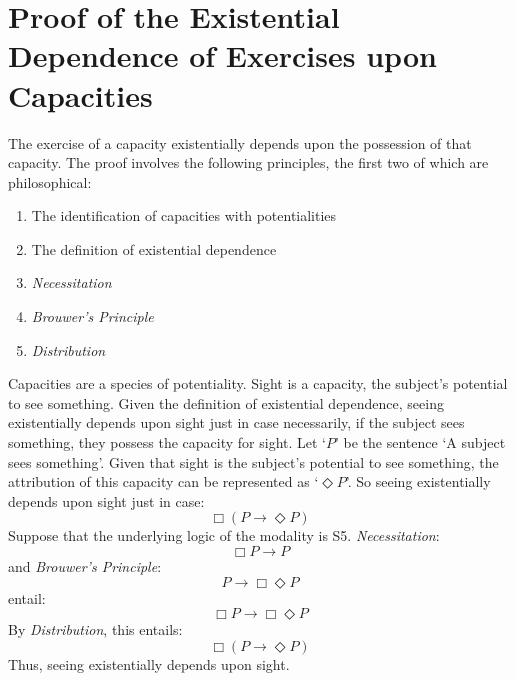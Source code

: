 \documentclass[12pt]{article}
\begin{document}

\appendix
\section{Proof of the Existential Dependence of Exercises upon Capacities} %
\label{sec:appendix}

The exercise of a capacity existentially depends upon the possession of that capacity. The proof involves the following principles, the first two of which are philosophical:
\begin{enumerate}
	\item The identification of capacities with potentialities
	\item The definition of existential dependence
	\item \emph{Necessitation}
	\item \emph{Brouwer's Principle}
	\item \emph{Distribution}
\end{enumerate}
Capacities are a species of potentiality. Sight is a capacity, the subject's potential to see something. Given the definition of existential dependence, seeing existentially depends upon sight just in case necessarily, if the subject sees something, they possess the capacity for sight. Let `\( P \)' be the sentence `A subject sees something'. Given that sight is the subject's potential to see something, the attribution of this capacity can be represented as `\( \Diamond P \)'. So seeing existentially depends upon sight just in case:
\[
	\Box(P \rightarrow \Diamond P)
\]
Suppose that the underlying logic of the modality is S5. \emph{Necessitation}:
\[
	\Box P \rightarrow P
\]
and \emph{Brouwer's Principle}:
\[
	P \rightarrow \Box \Diamond P
\]
entail:
\[
	\Box P \rightarrow \Box \Diamond P
\]
By \emph{Distribution}, this entails:
\[
	\Box(P \rightarrow \Diamond P)
\]
Thus, seeing existentially depends upon sight.


 
 
\end{document}
